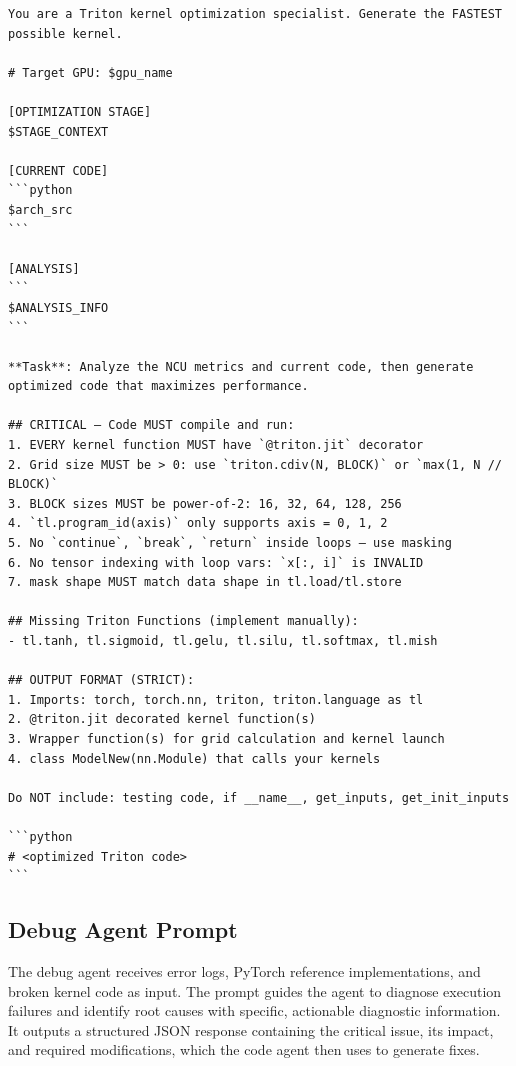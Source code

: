 \begin{mdframed}[linewidth=1pt, linecolor=black, backgroundcolor=gray!5]
\begin{lstlisting}
You are a Triton kernel optimization specialist. Generate the FASTEST possible kernel.

# Target GPU: $gpu_name

[OPTIMIZATION STAGE]
$STAGE_CONTEXT

[CURRENT CODE]
```python
$arch_src
```

[ANALYSIS]
```
$ANALYSIS_INFO
```

**Task**: Analyze the NCU metrics and current code, then generate optimized code that maximizes performance.

## CRITICAL — Code MUST compile and run:
1. EVERY kernel function MUST have `@triton.jit` decorator
2. Grid size MUST be > 0: use `triton.cdiv(N, BLOCK)` or `max(1, N // BLOCK)`
3. BLOCK sizes MUST be power-of-2: 16, 32, 64, 128, 256
4. `tl.program_id(axis)` only supports axis = 0, 1, 2
5. No `continue`, `break`, `return` inside loops — use masking
6. No tensor indexing with loop vars: `x[:, i]` is INVALID
7. mask shape MUST match data shape in tl.load/tl.store

## Missing Triton Functions (implement manually):
- tl.tanh, tl.sigmoid, tl.gelu, tl.silu, tl.softmax, tl.mish

## OUTPUT FORMAT (STRICT):
1. Imports: torch, torch.nn, triton, triton.language as tl
2. @triton.jit decorated kernel function(s)
3. Wrapper function(s) for grid calculation and kernel launch
4. class ModelNew(nn.Module) that calls your kernels

Do NOT include: testing code, if __name__, get_inputs, get_init_inputs

```python
# <optimized Triton code>
```
\end{lstlisting}
\end{mdframed}

\subsection{Debug Agent Prompt}

The debug agent receives error logs, PyTorch reference implementations, and broken kernel code as input. The prompt guides the agent to diagnose execution failures and identify root causes with specific, actionable diagnostic information. It outputs a structured JSON response containing the critical issue, its impact, and required modifications, which the code agent then uses to generate fixes.

